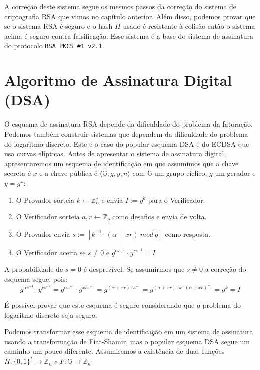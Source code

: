 A correção deste sistema segue os mesmos passos da correção do sistema de criptografia RSA que vimos no capítulo anterior.
Além disso, podemos provar que se o sistema RSA é seguro e o hash $H$ usado é resistente à colisão então o sistema acima é seguro contra falsificação.
Esse sistema é a base do sistema de assinatura do protocolo {\tt RSA PKCS \#1 v2.1}.

\section{Algoritmo de Assinatura Digital (DSA)}
\label{sec:dsa}

O esquema de assinatura RSA depende da dificuldade do problema da fatoração.
Podemos também construir sistemas que dependem da dificuldade do problema do logaritmo discreto.
Este é o caso do popular esquema DSA e do ECDSA que usa curvas elípticas.
Antes de apresentar o sistema de assinatura digital, apresentaremos um esquema de identificação em que assumimos que a chave secreta é $x$ e a chave pública é $\langle \mathbb{G}, g, y, n \rangle$ com $\mathbb{G}$ um grupo cíclico, $g$ um gerador e $y = g^x$:

\begin{enumerate}
\item O Provador sorteia $k \leftarrow \mathbb{Z}_n^\star$ e envia $I := g^k$ para o Verificador.
\item O Verificador sorteia $a, r \leftarrow \mathbb{Z}_q$ como desafios e envia de volta.
\item O Provador envia $s := [k^{-1} \cdot (\alpha + xr)\ mod\ q]$ como resposta.
\item O Verificador aceita se $s \neq 0$ e $g^{\alpha s^{-1}} \cdot y^{rs^{-1}} = I$
\end{enumerate}

A probabilidade de $s = 0$ é desprezível.
Se assumirmos que $s \neq 0$ a correção do esquema segue, pois:
\begin{displaymath}
  g^{\alpha s^{-1}} \cdot y^{rs^{-1}} = g^{\alpha s^{-1}} \cdot g^{xrs^{-1}} = g^{(\alpha + xr)\cdot s^{-1}} = g^{(\alpha + xr)\cdot k \cdot (\alpha + xr)^{-1}} = g^k = I
\end{displaymath}

É possível provar que este esquema é seguro considerando que o problema do logaritmo discreto seja seguro.

Podemos transformar esse esquema de identificação em um sistema de assinatura usando a transformação de Fiat-Shamir, mas o popular esquema DSA segue um caminho um pouco diferente.
Assumiremos a existência de duas funções $H: \{0,1\}^* \to \mathbb{Z}_n$ e $F: \mathbb{G} \to \mathbb{Z}_n$:

